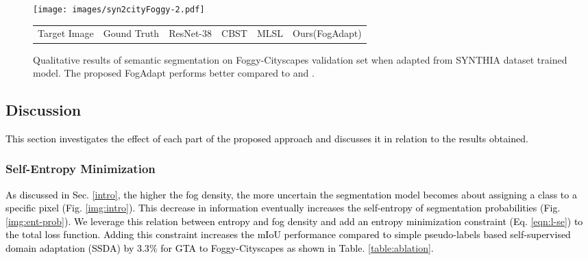 \documentclass[final,5p,times,twocolumn]{elsarticle}
\begin{document}
\begin{figure*}[t]
	\centering
\texttt{[image: images/syn2cityFoggy-2.pdf]}\\
	\footnotesize
	\begin{tabular}{P{1.5cm}P{1.45cm}P{1.8cm}P{1.5cm}P{1.45cm}P{1.4cm}}
    Target Image & Gound Truth & ResNet-38 \cite{wu2019Resnet38} &CBST \cite{zou2018unsupervised} & MLSL \cite{mlsl2020} & Ours(FogAdapt)
    \end{tabular}
    \caption{Qualitative results of semantic segmentation on Foggy-Cityscapes validation set when adapted from SYNTHIA dataset trained model. The proposed FogAdapt performs better compared to \cite{zou2018unsupervised} and \cite{mlsl2020}.}
\label{img:syn2cityFoggy}
\end{figure*}
\subsection{Discussion}
\textcolor{black}{This section investigates the effect of each part of the proposed approach and discusses it in relation to the results obtained.}

\subsubsection{Self-Entropy Minimization}
\textcolor{black}{
As discussed in Sec. \ref{intro}, the higher the fog density, the more uncertain the segmentation model becomes about assigning a class to a specific pixel (Fig. \ref{img:intro}). This decrease in information eventually increases the self-entropy of segmentation probabilities (Fig. \ref{img:ent-prob}). \textcolor{black}{We leverage this relation between entropy and fog density and add an entropy minimization constraint (Eq. \ref{eqn:l-se}) to the total loss function}. Adding this constraint increases the mIoU performance compared to simple pseudo-labels based self-supervised domain adaptation (SSDA) by $3.3\%$ for GTA to Foggy-Cityscapes as shown in Table. \ref{table:ablation}. 
}

\begin{table}[H]
\footnotesize
\centering
\caption{Effect of self-entropy and scale invariance. SSDA: Self-supervised domain adaptation. Here SE is Self-entropy while SI is Scale Invariance.}
\label{table:ablation}
\end{table}
\end{document}
